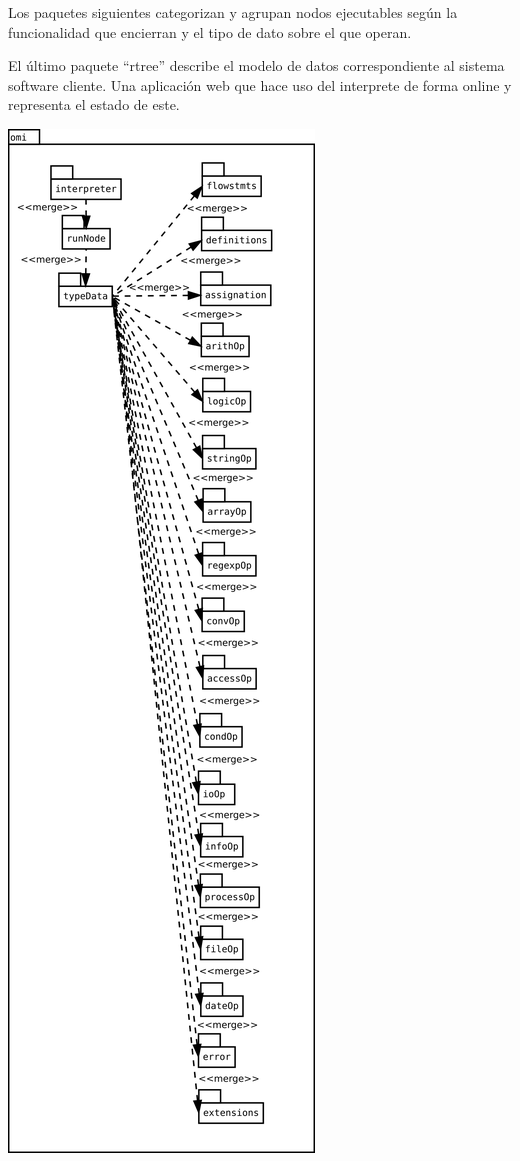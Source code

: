Los paquetes siguientes categorizan y agrupan nodos ejecutables según la funcionalidad 
que encierran y el tipo de dato sobre el que operan. 

El último paquete ``rtree'' describe el modelo de datos correspondiente al sistema 
software cliente. Una aplicación web que hace uso del interprete de forma online
y representa el estado de este.

\begin{center}
\includegraphics[scale=0.3]{package-omi.png} \\
\end{center}
\pagebreak
